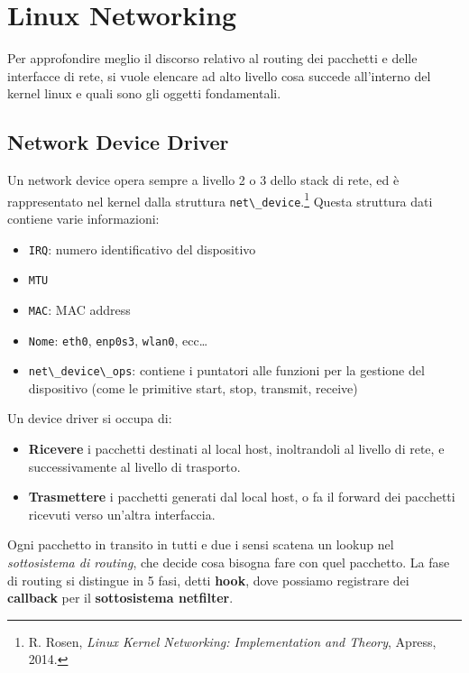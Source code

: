 \section{Linux Networking}\label{linux-networking}

Per approfondire meglio il discorso relativo al routing dei pacchetti e
delle interfacce di rete, si vuole elencare ad alto livello cosa succede
all'interno del kernel linux e quali sono gli oggetti fondamentali.

\subsection{Network Device Driver}\label{network-device-driver}

Un network device opera sempre a livello 2 o 3 dello stack di rete, ed è
rappresentato nel kernel dalla struttura
\passthrough{\lstinline!net\_device!}.\footnote{\label{fn:ref_23}R. Rosen, \emph{Linux
  Kernel Networking: Implementation and Theory}, Apress, 2014.} Questa
struttura dati contiene varie informazioni:

\begin{itemize}
\tightlist
\item
  \passthrough{\lstinline!IRQ!}: numero identificativo del dispositivo
\item
  \passthrough{\lstinline!MTU!}
\item
  \passthrough{\lstinline!MAC!}: MAC address
\item
  \passthrough{\lstinline!Nome!}: \passthrough{\lstinline!eth0!},
  \passthrough{\lstinline!enp0s3!}, \passthrough{\lstinline!wlan0!},
  ecc\ldots{}
\item
  \passthrough{\lstinline!net\_device\_ops!}: contiene i puntatori alle
  funzioni per la gestione del dispositivo (come le primitive start,
  stop, transmit, receive)
\end{itemize}

Un device driver si occupa di:

\begin{itemize}
\tightlist
\item
  \textbf{Ricevere} i pacchetti destinati al local host, inoltrandoli al
  livello di rete, e successivamente al livello di trasporto.
\item
  \textbf{Trasmettere} i pacchetti generati dal local host, o fa il
  forward dei pacchetti ricevuti verso un'altra interfaccia.
\end{itemize}

Ogni pacchetto in transito in tutti e due i sensi scatena un lookup nel
\emph{sottosistema di routing}, che decide cosa bisogna fare con quel
pacchetto. La fase di routing si distingue in 5 fasi, detti
\textbf{hook}, dove possiamo registrare dei \textbf{callback} per il
\textbf{sottosistema netfilter}.

